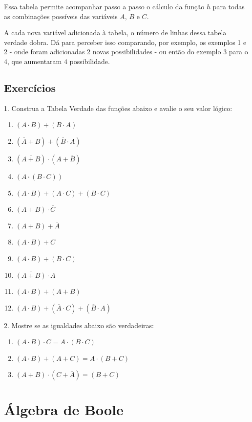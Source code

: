 \documentclass[12pt]{article}
\begin{document}
Essa tabela permite acompanhar passo a passo o cálculo da função \( h \) para todas as combinações possíveis das variáveis \( A \), \( B \) e \( C \).

\begin{tcolorbox}[mynote, title= Observação: números de linhas da Tabela Verdade]
A cada nova variável adicionada à tabela, o número de linhas dessa tabela verdade dobra. Dá para perceber isso comparando, por exemplo, os exemplos 1 e 2 - onde foram adicionadas 2 novas possibilidades - ou então do exemplo 3 para o 4, que aumentaram 4 possibilidade.  
\end{tcolorbox}

\subsection{Exercícios}
1. Construa a Tabela Verdade das funções abaixo e avalie o seu valor lógico:
\begin{enumerate}
    \item $(A \cdot B) + (B \cdot A)$
    \item $(\overline{A} + B) + (\overline{B} \cdot A)$
    \item $(\overline{A + B}) \cdot  (A + \overline{B})$
    \item $(A \cdot (B \cdot C))$
    \item $(A \cdot B) + (A \cdot C) + (B \cdot C)$
    \item $(A + B) \cdot \overline{C}$
    \item $(A + B) + \overline{A}$
    \item $(A \cdot B) + C$
    \item $(A \cdot B) + (B \cdot C)$
    \item $\overline{(A + B)} \cdot A$
    \item $(A \cdot B) + (A + B)$
    \item $(A \cdot B) + (\overline{A} \cdot C) + (\overline{B} \cdot A)$
\end{enumerate}

2. Mostre se as igualdades abaixo são verdadeiras:
\begin{enumerate}
    \item $(A \cdot B) \cdot C =  A \cdot (B \cdot C)$
    \item $(A \cdot B) + ( A + C) = A \cdot (B + C)$
    \item $(A + B) \cdot (C + \overline{A}) = (B + C)$
\end{enumerate}
\section{Álgebra de Boole}
\end{document}
